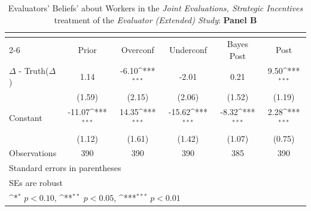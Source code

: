 \begin{table}[htbp]\centering
\def\sym#1{\ifmmode^{#1}\else\(^{#1}\)\fi}
\caption{Evaluators' Beliefs' about Workers in the \textit{Joint Evaluations, Strategic Incentives} treatment of the \textit{Evaluator (Extended) Study}: \textbf{Panel B}}
\begin{tabular}{l*{5}{c}}
\hline\hline
                &\multicolumn{5}{c}{}                                                                          \\\cmidrule(lr){2-6}
                &\multicolumn{1}{c}{Prior}&\multicolumn{1}{c}{Overconf}&\multicolumn{1}{c}{Underconf}&\multicolumn{1}{c}{Bayes Post}&\multicolumn{1}{c}{Post}\\
\hline
$\Delta$ - Truth($\Delta$)&     1.14         &    -6.10\sym{***}&    -2.01         &     0.21         &     9.50\sym{***}\\
                &   (1.59)         &   (2.15)         &   (2.06)         &   (1.52)         &   (1.19)         \\
Constant        &   -11.07\sym{***}&    14.35\sym{***}&   -15.62\sym{***}&    -8.32\sym{***}&     2.28\sym{***}\\
                &   (1.12)         &   (1.61)         &   (1.42)         &   (1.07)         &   (0.75)         \\
\hline
Observations    &      390         &      390         &      390         &      385         &      390         \\
\hline\hline
\multicolumn{6}{l}{\footnotesize Standard errors in parentheses}\\
\multicolumn{6}{l}{\footnotesize SEs are robust}\\
\multicolumn{6}{l}{\footnotesize \sym{*} \(p<0.10\), \sym{**} \(p<0.05\), \sym{***} \(p<0.01\)}\\
\end{tabular}
\end{table}
